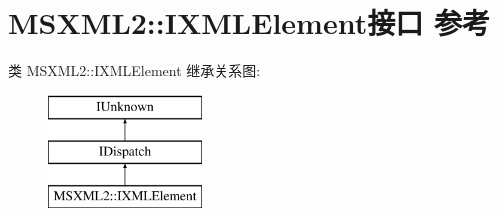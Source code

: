 \hypertarget{interface_m_s_x_m_l2_1_1_i_x_m_l_element}{}\section{M\+S\+X\+M\+L2\+:\+:I\+X\+M\+L\+Element接口 参考}
\label{interface_m_s_x_m_l2_1_1_i_x_m_l_element}
类 M\+S\+X\+M\+L2\+:\+:I\+X\+M\+L\+Element 继承关系图\+:\begin{figure}[H]
\begin{center}
\leavevmode
\includegraphics[height=3.000000cm]{interface_m_s_x_m_l2_1_1_i_x_m_l_element}
\end{center}
\end{figure}
